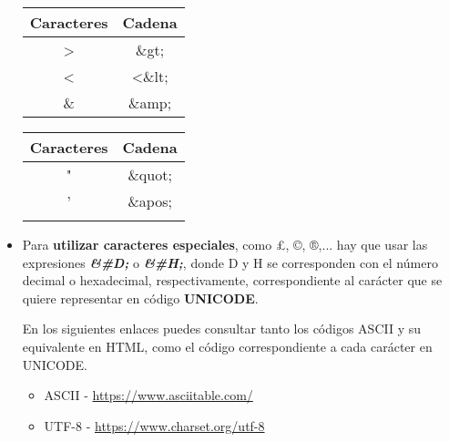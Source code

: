 \begin{itemize}
    \begin{table}[ht]
        \centering
        {\renewcommand{\arraystretch}{1.5}
            \begin{tabular}{ |l|l| }
                \hline
                \multicolumn{1}{|c|}{\textbf{Caracteres}} & \multicolumn{1}{|c|}{\textbf{Cadena}} \\ \hline
                \multicolumn{1}{|c|}{>} & \multicolumn{1}{|c|}{\&gt;} \\ \hline
                \multicolumn{1}{|c|}{<} & \multicolumn{1}{|c|}{<\&lt;} \\ \hline
                \multicolumn{1}{|c|}{\&} & \multicolumn{1}{|c|}{\&amp;} \\ \hline
        \end{tabular}}
         \quad
        {\renewcommand{\arraystretch}{1.5}
            \begin{tabular}{ |l|l| }
                \hline
                \multicolumn{1}{|c|}{\textbf{Caracteres}} & \multicolumn{1}{|c|}{\textbf{Cadena}} \\ \hline
                \multicolumn{1}{|c|}{"} & \multicolumn{1}{|c|}{\&quot;} \\ \hline
                \multicolumn{1}{|c|}{'} & \multicolumn{1}{|c|}{\&apos;} \\ \hline
                \multicolumn{1}{|c}{}& \\ \hline
        \end{tabular}}
     \end{table}

     \item Para \textbf{utilizar caracteres especiales}, como £, ©, ®,... hay que usar las expresiones \textit{\textbf{\&\#D;}} o \textit{\textbf{\&\#H;}}, donde D y H se corresponden con el número decimal o hexadecimal, respectivamente, correspondiente al carácter que se quiere representar en código \textbf{UNICODE}.

     En los siguientes enlaces puedes consultar tanto los códigos ASCII y su equivalente en HTML, como el código correspondiente a cada carácter en UNICODE.

     \begin{itemize}
         \item ASCII - \url{https://www.asciitable.com/}
         \item UTF-8 - \url{https://www.charset.org/utf-8}
     \end{itemize}
\end{itemize}

